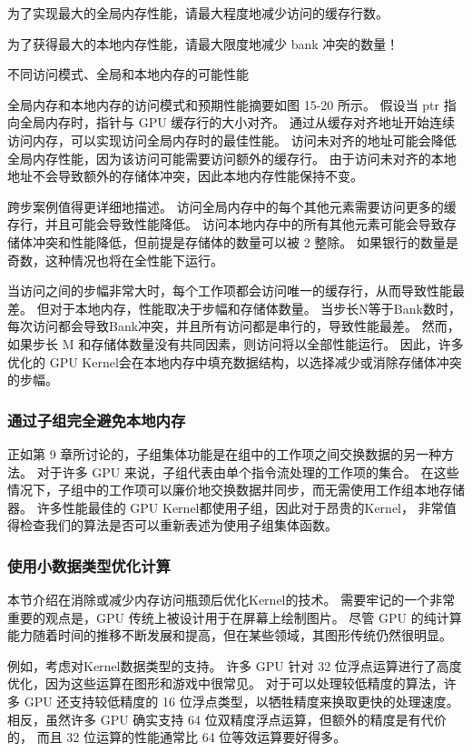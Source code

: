 \begin{remark}
为了实现最大的全局内存性能，请最大程度地减少访问的缓存行数。

为了获得最大的本地内存性能，请最大限度地减少 bank 冲突的数量！
\end{remark}

{\color{red} 不同访问模式、全局和本地内存的可能性能}

全局内存和本地内存的访问模式和预期性能摘要如图 15-20 所示。 
假设当 ptr 指向全局内存时，指针与 GPU 缓存行的大小对齐。 
通过从缓存对齐地址开始连续访问内存，可以实现访问全局内存时的最佳性能。 
访问未对齐的地址可能会降低全局内存性能，因为该访问可能需要访问额外的缓存行。 
由于访问未对齐的本地地址不会导致额外的存储体冲突，因此本地内存性能保持不变。

跨步案例值得更详细地描述。 访问全局内存中的每个其他元素需要访问更多的缓存行，并且可能会导致性能降低。 
访问本地内存中的所有其他元素可能会导致存储体冲突和性能降低，但前提是存储体的数量可以被 2 整除。 
如果银行的数量是奇数，这种情况也将在全性能下运行。

当访问之间的步幅非常大时，每个工作项都会访问唯一的缓存行，从而导致性能最差。 
但对于本地内存，性能取决于步幅和存储体数量。 
当步长N等于Bank数时，每次访问都会导致Bank冲突，并且所有访问都是串行的，导致性能最差。 
然而，如果步长 M 和存储体数量没有共同因素，则访问将以全部性能运行。 
因此，许多优化的 GPU Kernel会在本地内存中填充数据结构，以选择减少或消除存储体冲突的步幅。

\subsubsection{通过子组完全避免本地内存}
正如第 9 章所讨论的，子组集体功能是在组中的工作项之间交换数据的另一种方法。 
对于许多 GPU 来说，子组代表由单个指令流处理的工作项的集合。 
在这些情况下，子组中的工作项可以廉价地交换数据并同步，而无需使用工作组本地存储器。 
许多性能最佳的 GPU Kernel都使用子组，因此对于昂贵的Kernel，
非常值得检查我们的算法是否可以重新表述为使用子组集体函数。

\subsubsection{使用小数据类型优化计算}
本节介绍在消除或减少内存访问瓶颈后优化Kernel的技术。 
需要牢记的一个非常重要的观点是，GPU 传统上被设计用于在屏幕上绘制图片。 
尽管 GPU 的纯计算能力随着时间的推移不断发展和提高，但在某些领域，其图形传统仍然很明显。

例如，考虑对Kernel数据类型的支持。 许多 GPU 针对 32 位浮点运算进行了高度优化，因为这些运算在图形和游戏中很常见。 
对于可以处理较低精度的算法，许多 GPU 还支持较低精度的 16 位浮点类型，以牺牲精度来换取更快的处理速度。 
相反，虽然许多 GPU 确实支持 64 位双精度浮点运算，但额外的精度是有代价的，
而且 32 位运算的性能通常比 64 位等效运算要好得多。

